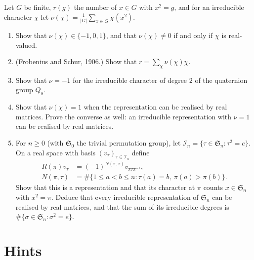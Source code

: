\begin{exercise}[$\star\star\star$]\label{pb:frobschur}
Let $G$ be finite, $r(g)$ the number of $x\in G$ with $x^2=g$, and for an irreducible character $\chi$ let
$\nu(\chi)=\frac1{|G|}\sum_{x\in G}\chi(x^2)$.
\begin{enumerate}[label=(\alph*)]
\item Show that $\nu(\chi)\in\{-1,0,1\}$, and that $\nu(\chi)\ne0$ if and only if $\chi$ is real-valued.
\item (Frobenius and Schur, 1906.) Show that $r=\sum_\chi\nu(\chi)\chi$.
\item Show that $\nu=-1$ for the irreducible character of degree $2$ of the quaternion group $Q_8$.
\item Show that $\nu(\chi)=1$ when the representation can be realised by real matrices. Prove the converse as well: an irreducible representation with $\nu=1$ can be realised by real matrices.
\item For $n\ge0$ (with $\mathfrak S_0$ the trivial permutation group), let
$\mathcal I_n=\{\tau\in\mathfrak S_n:\tau^2=e\}$.
On a real space with basis $(v_\tau)_{\tau\in\mathcal I_n}$ define
\[
\begin{aligned}
R(\pi)v_\tau&=(-1)^{N(\pi,\tau)}v_{\pi\tau\pi^{-1}},\\
N(\pi,\tau)&=\#\{1\le a<b\le n:\tau(a)=b,\ \pi(a)>\pi(b)\}.
\end{aligned}
\]
Show that this is a representation and that its character at $\pi$ counts
$x\in\mathfrak S_n$ with $x^2=\pi$.
Deduce that every irreducible representation of $\mathfrak S_n$ can be
realised by real matrices, and that the sum of its irreducible degrees is
$\#\{\sigma\in\mathfrak S_n:\sigma^2=e\}$.
\end{enumerate}
\end{exercise}

\section{Hints}

